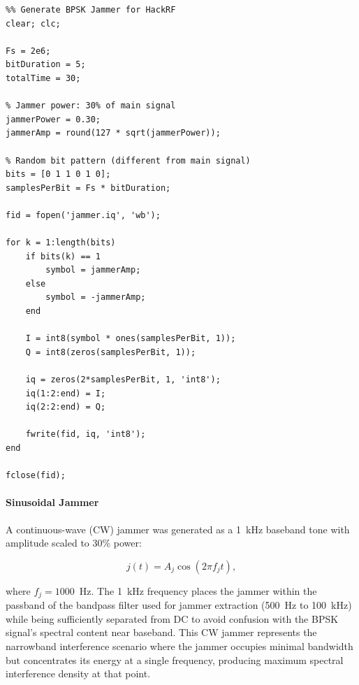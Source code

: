 \documentclass{article}
\begin{document}
\begin{verbatim}
%% Generate BPSK Jammer for HackRF
clear; clc;

Fs = 2e6;
bitDuration = 5;
totalTime = 30;

% Jammer power: 30% of main signal
jammerPower = 0.30;
jammerAmp = round(127 * sqrt(jammerPower));

% Random bit pattern (different from main signal)
bits = [0 1 1 0 1 0];
samplesPerBit = Fs * bitDuration;

fid = fopen('jammer.iq', 'wb');

for k = 1:length(bits)
    if bits(k) == 1
        symbol = jammerAmp;
    else
        symbol = -jammerAmp;
    end

    I = int8(symbol * ones(samplesPerBit, 1));
    Q = int8(zeros(samplesPerBit, 1));

    iq = zeros(2*samplesPerBit, 1, 'int8');
    iq(1:2:end) = I;
    iq(2:2:end) = Q;

    fwrite(fid, iq, 'int8');
end

fclose(fid);
\end{verbatim}

\paragraph{Sinusoidal Jammer}

A continuous-wave (CW) jammer was generated as a 1~kHz baseband tone with amplitude scaled to 30\% power:

\begin{equation}
j(t) = A_j \cos(2\pi f_j t),
\end{equation}

where $f_j = 1000$~Hz. The 1~kHz frequency places the jammer within the passband of the bandpass filter used for jammer extraction (500~Hz to 100~kHz) while being sufficiently separated from DC to avoid confusion with the BPSK signal's spectral content near baseband. This CW jammer represents the narrowband interference scenario where the jammer occupies minimal bandwidth but concentrates its energy at a single frequency, producing maximum spectral interference density at that point.
\end{document}
